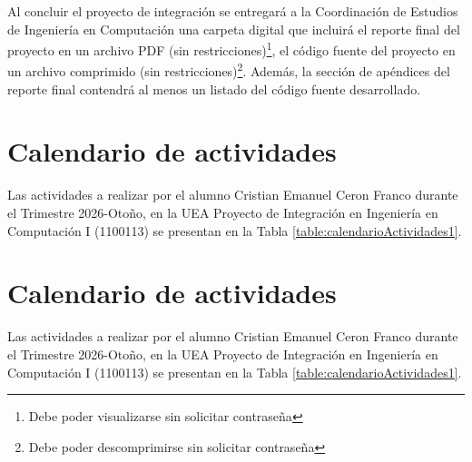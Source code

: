 Al concluir el proyecto de integración se entregará a la Coordinación de Estudios de Ingeniería en Computación una carpeta digital que incluirá el reporte final del proyecto en un archivo PDF (sin restricciones)\footnote{Debe poder visualizarse sin solicitar contraseña}, el código fuente del proyecto en un archivo comprimido (sin restricciones)\footnote{Debe poder descomprimirse sin solicitar contraseña}. Además, la sección de apéndices del reporte final contendrá al menos un listado del código fuente desarrollado.
\section{Calendario de actividades}
Las actividades a realizar por el alumno Cristian Emanuel Ceron Franco durante el Trimestre 2026-Otoño, en la UEA Proyecto de Integración en Ingeniería en Computación I (1100113) se presentan en la Tabla \ref{table:calendarioActividades1}.

\section{Calendario de actividades}
Las actividades a realizar por el alumno Cristian Emanuel Ceron Franco durante el Trimestre 2026-Otoño, en la UEA Proyecto de Integración en Ingeniería en Computación I (1100113) se presentan en la Tabla \ref{table:calendarioActividades1}.

